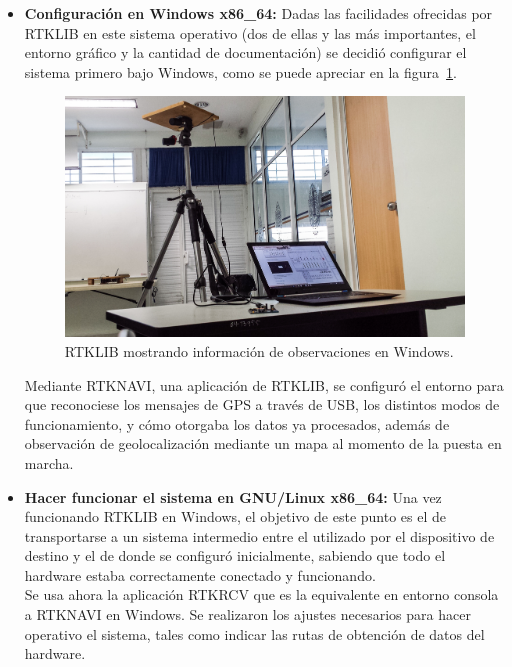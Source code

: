 \begin{itemize}
\item \textbf{Configuración en Windows x86\_64:} Dadas las facilidades ofrecidas por RTKLIB en este sistema operativo (dos de ellas y las más importantes, el entorno gráfico y la cantidad de documentación) se decidió configurar el sistema primero bajo Windows, como se puede apreciar en la figura~\ref{fig:RTKWin}. \\

\begin{figure}[H]
\centering
\includegraphics[scale=0.47]{Figures/BaseStatWin}
\caption[RTKLIB mostrando información de observaciones en Windows.]{RTKLIB mostrando información de observaciones en Windows.}
\label{fig:RTKWin}
\end{figure}

Mediante RTKNAVI, una aplicación de RTKLIB, se configuró el entorno para que reconociese los mensajes de GPS a través de USB, los distintos modos de funcionamiento, y cómo otorgaba los datos ya procesados, además de observación de geolocalización mediante un mapa al momento de la puesta en marcha.\\

\item \textbf{Hacer funcionar el sistema en GNU/Linux x86\_64:} Una vez funcionando RTKLIB en Windows, el objetivo de este punto es el de transportarse a un sistema intermedio entre el utilizado por el dispositivo de destino y el de donde se configuró inicialmente, sabiendo que todo el hardware estaba correctamente conectado y funcionando.\\ 

Se usa ahora la aplicación RTKRCV que es la equivalente en entorno consola a RTKNAVI en Windows. Se realizaron los ajustes necesarios para hacer operativo el sistema, tales como indicar las rutas de obtención de datos del hardware.\\


\end{itemize}
